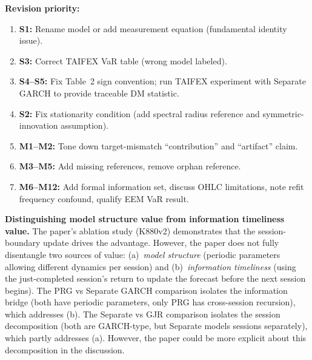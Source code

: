 \documentclass[12pt,a4paper]{article}
\begin{document}
\medskip
\textbf{Revision priority:}
\begin{enumerate}
\item \textbf{S1:} Rename model or add measurement equation (fundamental identity issue).
\item \textbf{S3:} Correct TAIFEX VaR table (wrong model labeled).
\item \textbf{S4--S5:} Fix Table~2 sign convention; run TAIFEX experiment with Separate GARCH to provide traceable DM statistic.
\item \textbf{S2:} Fix stationarity condition (add spectral radius reference and symmetric-innovation assumption).
\item \textbf{M1--M2:} Tone down target-mismatch ``contribution'' and ``artifact'' claim.
\item \textbf{M3--M5:} Add missing references, remove orphan reference.
\item \textbf{M6--M12:} Add formal information set, discuss OHLC limitations, note refit frequency confound, qualify EEM VaR result.
\end{enumerate}

\medskip
\textbf{Distinguishing model structure value from information timeliness value.}
The paper's ablation study (K880v2) demonstrates that the session-boundary update drives the advantage. However, the paper does not fully disentangle two sources of value: (a)~\emph{model structure} (periodic parameters allowing different dynamics per session) and (b)~\emph{information timeliness} (using the just-completed session's return to update the forecast before the next session begins). The PRG vs Separate GARCH comparison isolates the information bridge (both have periodic parameters, only PRG has cross-session recursion), which addresses (b). The Separate vs GJR comparison isolates the session decomposition (both are GARCH-type, but Separate models sessions separately), which partly addresses (a). However, the paper could be more explicit about this decomposition in the discussion.
\end{document}
